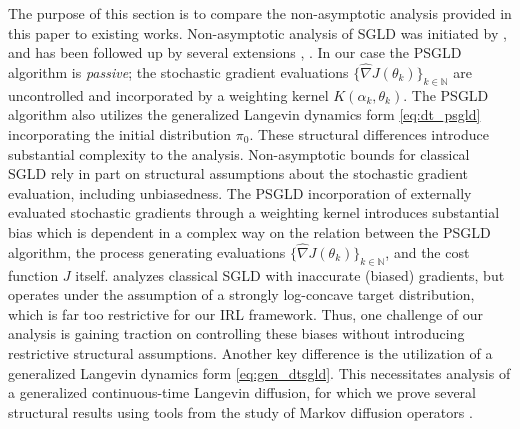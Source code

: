 \documentclass[journal,onecolumn]{IEEEtran}
\newcommand{\alk}{\alpha_k}
\newcommand{\thk}{\theta_k}
\newcommand{\gradn}{\hat{\nabla}}
\newcommand{\rew}{J}
\newcommand{\idistr}{\ids_0}
\newcommand{\N}{\mathbb{N}}
\newcommand{\ids}{\pi}
\begin{document}
The purpose of this section is to compare the non-asymptotic analysis provided in this paper to existing works. Non-asymptotic analysis of SGLD was initiated by \cite{raginsky2017non}, and has been followed up by several extensions \cite{dalalyan2019user}, 
\cite{cheng2018underdamped}. In our case the PSGLD algorithm is \textit{passive}; the stochastic gradient evaluations $\{\gradn\rew(\thk)\}_{k\in\N}$ are uncontrolled and incorporated by a weighting kernel $K(\alk,\thk)$. The PSGLD algorithm also utilizes the generalized Langevin dynamics form \eqref{eq:dt_psgld} incorporating the initial distribution $\idistr$. These structural differences introduce substantial complexity to the analysis. Non-asymptotic bounds for classical SGLD rely in part on structural assumptions about the stochastic gradient evaluation, including unbiasedness. The PSGLD incorporation of externally evaluated stochastic gradients through a weighting kernel introduces substantial bias which is dependent in a complex way on the relation between the PSGLD algorithm, the process generating evaluations $\{\gradn\rew(\thk)\}_{k\in\N}$, and the cost function $\rew$ itself. \cite{dalalyan2019user} analyzes classical SGLD with inaccurate (biased) gradients, but operates under the assumption of a strongly log-concave target distribution, which is far too restrictive for our IRL framework. Thus, one challenge of our analysis is gaining traction on controlling these biases without introducing restrictive structural assumptions. Another key difference is the utilization of a generalized Langevin dynamics form \eqref{eq:gen_dtsgld}. This necessitates analysis of a generalized continuous-time Langevin diffusion, for which we prove several structural results using tools from the study of Markov diffusion operators \cite{bakry2014analysis}. 
\end{document}
